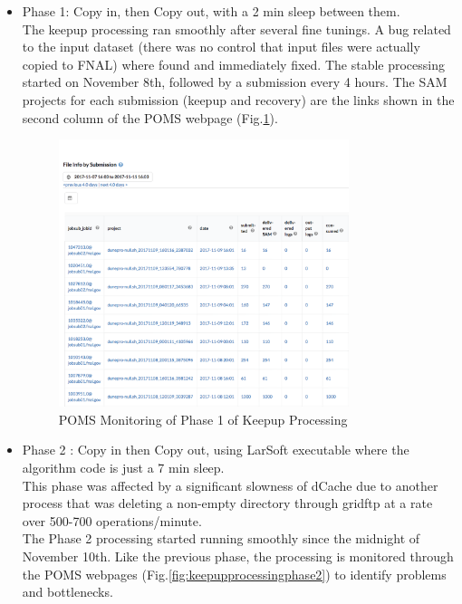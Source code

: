 \documentclass[pdftex,12pt,letter]{article}
\begin{document}
\begin{itemize}
\item Phase 1: Copy in, then Copy out, with a 2 min sleep between them.\\
The keepup processing ran smoothly after several fine tunings.
A bug related to the input dataset (there was no control that input files were actually copied to FNAL) where found and immediately fixed.
The stable processing started on November 8th, followed by a submission every 4 hours. 
The SAM projects for each submission (keepup and recovery) are  the links shown in the second column of the POMS webpage (Fig.\ref{fig:keepupprocessingphase1}).


\begin{figure}[tbh]
  \centering
  \includegraphics[width=0.8\textwidth]{./ReportImages/DC1_Phase1.png}
  \caption{POMS Monitoring of Phase 1 of Keepup Processing}
  \label{fig:keepupprocessingphase1}
\end{figure}

\item Phase 2 : Copy in then  Copy out, using LarSoft executable where the algorithm code is just a 7 min sleep. \\
This phase was affected by a significant slowness of dCache due to another process that was deleting a non-empty directory through gridftp at a rate over 500-700 operations/minute. \\
The Phase 2 processing started running smoothly since the midnight of November 10th.
Like the previous phase, the processing is monitored through the POMS webpages (Fig.\ref{fig:keepupprocessingphase2}) to identify problems and bottlenecks.
\pagebreak


\end{itemize}
\end{document}

